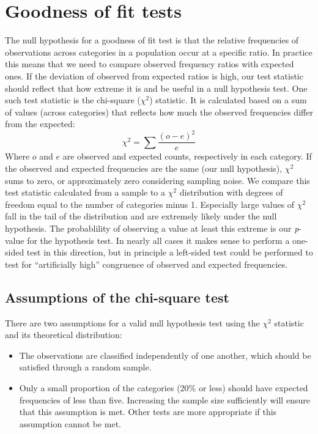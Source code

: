 \documentclass[]{book}
\begin{document}
\hypertarget{goodness-of-fit-tests}{%
\section{Goodness of fit tests}\label{goodness-of-fit-tests}}

The null hypothesis for a goodness of fit test is that the relative frequencies of observations across categories in a population occur at a specific ratio. In practice this means that we need to compare observed frequency ratios with expected ones. If the deviation of observed from expected ratios is high, our test statistic should reflect that how extreme it is and be useful in a null hypothesis test. One such test statistic is the chi-square (\(\chi^2\)) statistic. It is calculated based on a sum of values (across categories) that reflects how much the observed frequencies differ from the expected:
\[\chi^2=\sum\frac{(o-e)^2}{e}\]
Where \(o\) and \(e\) are observed and expected counts, respectively in each category. If the observed and expected frequencies are the same (our null hypothesis), \(\chi^2\) sums to zero, or approximately zero considering sampling noise. We compare this test statistic calculated from a sample to a \(\chi^2\) distribution with degrees of freedom equal to the number of categories minus 1. Especially large values of \(\chi^2\) fall in the tail of the distribution and are extremely likely under the null hypothesis. The probablility of observing a value at least this extreme is our \emph{p}-value for the hypothesis test. In nearly all cases it makes sense to perform a one-sided test in this direction, but in principle a left-sided test could be performed to test for ``artificially high'' congruence of observed and expected frequencies.

\hypertarget{assumptions-of-the-chi-square-test}{%
\subsection{Assumptions of the chi-square test}\label{assumptions-of-the-chi-square-test}}

There are two assumptions for a valid null hypothesis test using the \(\chi^2\) statistic and its theoretical distribution:

\begin{itemize}
\item
  The observations are classified independently of one another, which should be satisfied through a random sample.
\item
  Only a small proportion of the categories (20\% or less) should have expected frequencies of less than five. Increasing the sample size sufficiently will ensure that this assumption is met. Other tests are more appropriate if this assumption cannot be met.
\end{itemize}
\end{document}
